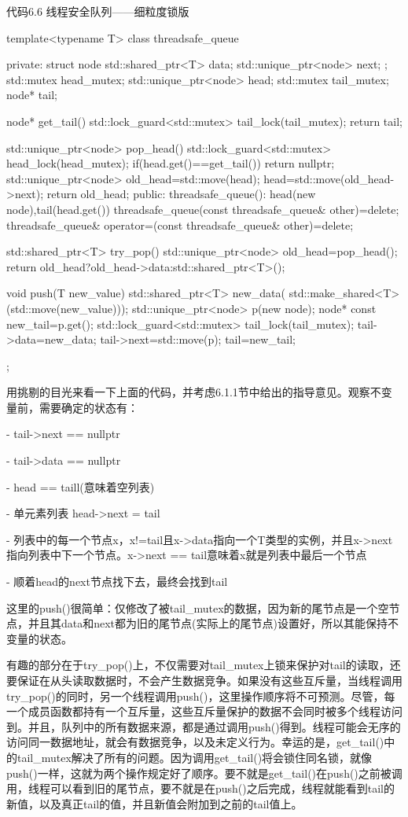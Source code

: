 代码6.6 线程安全队列——细粒度锁版

\begin{cpp}
template<typename T>
class threadsafe_queue
{
private:
  struct node
  {
    std::shared_ptr<T> data;
    std::unique_ptr<node> next;
  };
  std::mutex head_mutex;
  std::unique_ptr<node> head;
  std::mutex tail_mutex;
  node* tail;

  node* get_tail()
  {
    std::lock_guard<std::mutex> tail_lock(tail_mutex);
    return tail;
  }

  std::unique_ptr<node> pop_head()
  {
    std::lock_guard<std::mutex> head_lock(head_mutex);
    if(head.get()==get_tail())
    {
      return nullptr;
    }
    std::unique_ptr<node> old_head=std::move(head);
    head=std::move(old_head->next);
    return old_head;
  }
public:
  threadsafe_queue():
  head(new node),tail(head.get())
  {}
  threadsafe_queue(const threadsafe_queue& other)=delete;
  threadsafe_queue& operator=(const threadsafe_queue& other)=delete;

  std::shared_ptr<T> try_pop()
  {
     std::unique_ptr<node> old_head=pop_head();
     return old_head?old_head->data:std::shared_ptr<T>();
  }

  void push(T new_value)
  {
    std::shared_ptr<T> new_data(
      std::make_shared<T>(std::move(new_value)));
    std::unique_ptr<node> p(new node);
    node* const new_tail=p.get();
    std::lock_guard<std::mutex> tail_lock(tail_mutex);
    tail->data=new_data;
    tail->next=std::move(p);
    tail=new_tail;
  }
};
\end{cpp}

用挑剔的目光来看一下上面的代码，并考虑6.1.1节中给出的指导意见。观察不变量前，需要确定的状态有：

- tail->next == nullptr

- tail->data == nullptr

- head == taill(意味着空列表)

- 单元素列表 head->next = tail

- 列表中的每一个节点x，x!=tail且x->data指向一个T类型的实例，并且x->next指向列表中下一个节点。x->next == tail意味着x就是列表中最后一个节点

- 顺着head的next节点找下去，最终会找到tail

这里的push()很简单：仅修改了被tail\_mutex的数据，因为新的尾节点是一个空节点，并且其data和next都为旧的尾节点(实际上的尾节点)设置好，所以其能保持不变量的状态。

有趣的部分在于try\_pop()上，不仅需要对tail\_mutex上锁来保护对tail的读取，还要保证在从头读取数据时，不会产生数据竞争。如果没有这些互斥量，当线程调用try\_pop()的同时，另一个线程调用push()，这里操作顺序将不可预测。尽管，每一个成员函数都持有一个互斥量，这些互斥量保护的数据不会同时被多个线程访问到。并且，队列中的所有数据来源，都是通过调用push()得到。线程可能会无序的访问同一数据地址，就会有数据竞争，以及未定义行为。幸运的是，get\_tail()中的tail\_mutex解决了所有的问题。因为调用get\_tail()将会锁住同名锁，就像push()一样，这就为两个操作规定好了顺序。要不就是get\_tail()在push()之前被调用，线程可以看到旧的尾节点，要不就是在push()之后完成，线程就能看到tail的新值，以及真正tail的值，并且新值会附加到之前的tail值上。

